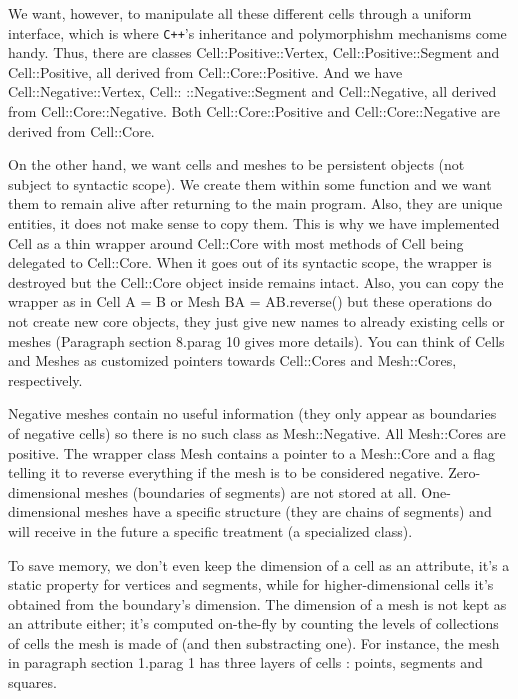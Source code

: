 {We want, however, to manipulate all these different cells through a uniform interface,
which is where {\tt C++}'s inheritance and polymorphishm mechanisms come handy.
Thus, there are classes {\codett Cell::Positive::Vertex}, {\codett Cell::Positive::Segment}
and {\codett Cell::Positive}, all derived from {\codett Cell::Core::Positive}.
And we have {\codett Cell::Negative::Vertex}, {\codett Cell:: ::Negative::Segment} and {\codett
Cell::Negative}, all derived from {\codett Cell::Core::Negative}.
Both {\codett Cell::Core::Positive} and {\codett Cell::Core::Negative} are derived from
{\codett Cell::Core}.

On the other hand, we want cells and meshes to be persistent objects (not subject to
syntactic scope).
We create them within some function and we want them to remain alive after returning
to the main program.
Also, they are unique entities, it does not make sense to copy them.
This is why we have implemented {\codett Cell} as a thin wrapper around {\codett Cell::Core}
with most methods of {\codett Cell} being delegated to {\codett Cell::Core}.
When it goes out of its syntactic scope, the wrapper is destroyed but the {\codett Cell::Core}
object inside remains intact.
Also, you can copy the wrapper as in {\codett Cell A = B} or {\codett Mesh BA = AB.reverse()}
but these operations do not create new core objects, they just give new names to
already existing cells or meshes (Paragraph \numb section 8.\numb parag 10 gives more details).
You can think of {\codett Cell}s and {\codett Mesh}es as customized pointers towards
{\codett Cell::Core}s and {\codett Mesh::Core}s, respectively.

Negative meshes contain no useful information (they only appear as boundaries
of negative cells) so there is no such class as {\codett Mesh::Negative}.
All {\codett Mesh::Core}s are positive.
The wrapper class {\codett Mesh} contains a pointer to a {\codett Mesh::Core} and a flag
telling it to reverse everything if the mesh is to be considered negative.
Zero-dimensional meshes (boundaries of segments) are not stored at all.
One-dimensional meshes have a specific structure (they are chains of segments)
and will receive in the future a specific treatment (a specialized class).

To save memory, we don't even keep the dimension of a cell as an attribute,
it's a static property for vertices and segments, while for higher-dimensional cells
it's obtained from the boundary's dimension.
The dimension of a mesh is not kept as an attribute either; it's computed on-the-fly
by counting the levels of collections of cells the mesh is made of (and then
substracting one).
For instance, the mesh in paragraph \numb section 1.\numb parag 1 has three layers of cells :
points, segments and squares.

}
